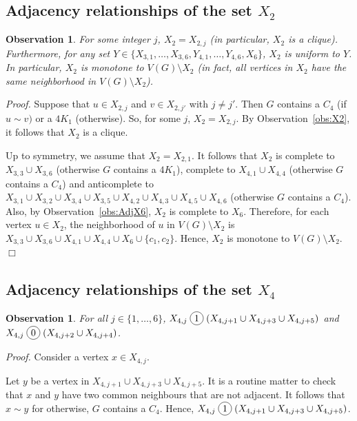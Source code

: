 \documentclass[12pt]{article}
\newcommand*\circled[1]{\tikz[baseline=(char.base)]{
		\node[shape=circle,draw,inner sep=2pt] (char) {#1};}}
\newtheorem{Observation}[Theorem]{Observation}
\newcommand{\join}{\; \circled{1} \;}
\newcommand{\cojoin}{\; \circled{0} \;}
\newcommand{\qed}{\hfill $\Box$}
\begin{document}
	\subsection{Adjacency relationships of the set $X_2$}\label{sec:X2}
	\begin{Observation}\label{obs:X2-uniform} 
		For some integer $j$, $X_2 = X_{2, j}$ (in particular, $X_2$ is a clique).  Furthermore, for any set $Y \in \{X_{3,1}, \ldots, X_{3,6}, Y_{4,1}, \ldots , Y_{4,6}, X_6 \}$, $X_2$ is uniform to $Y$. In particular, $X_2$ is monotone to $V(G)\setminus X_2$ (in fact, all vertices in $X_2$ have the same neighborhood in $V(G)\setminus X_2$).
	\end{Observation}
	{\it Proof.} 
	Suppose that $u\in X_{2, j}$ and $v\in X_{2, j'}$ with $j\neq j'$.  Then $G$ contains a $C_4$ (if $u\sim v)$ or a $4K_1$ (otherwise).  So, for some $j$, $X_2=X_{2, j}$.  By Observation~\ref{obs:X2}, it follows that $X_2$ is a clique. 
	
	Up to symmetry, we assume that $X_2 = X_{2, 1}$.  It follows that $X_2$ is complete to $X_{3, 3} \cup X_{3, 6}$ (otherwise $G$ contains a $4K_1$), complete to $X_{4, 1} \cup X_{4, 4}$ (otherwise $G$ contains a $C_4$) and anticomplete to $X_{3, 1} \cup X_{3, 2} \cup X_{3, 4} \cup X_{3, 5} \cup X_{4, 2} \cup X_{4, 3} \cup X_{4, 5} \cup X_{4, 6}$ (otherwise $G$ contains a $C_4$). Also, by Observation~\ref{obs:AdjX6}, $X_2$ is complete to $X_6$. Therefore, for each vertex $u\in X_2$, the neighborhood of $u$ in $V(G)\setminus X_2$ is $X_{3,3}\cup X_{3,6}\cup X_{4, 1} \cup X_{4, 4} \cup X_6\cup \{c_1,c_2\}$.
	Hence,  $X_2$ is monotone to $V(G) \setminus X_2$. 
	\qed
	
	
	
	\subsection{Adjacency relationships of the set $X_4$}\label{sec:X4}
	
	\begin{Observation}\label{obs:X4i-X4j}
		For all $j\in \{1, \dots, 6\}$, $X_{4,j} \join (X_{4,j+1} \cup X_{4,j+3} \cup X_{4,j+5})$ and 
		$X_{4,j} \cojoin (X_{4,j+2} \cup X_{4,j+4})$. 
	\end{Observation}
	\noindent
	{\it Proof.}  Consider a vertex $x \in X_{4,j}$. 
	
	Let $y$ be a vertex in $X_{4,j+1} \cup X_{4,j+3} \cup X_{4,j+5}$. It is a routine matter to check that $x$ and $y$ have two common neighbours that are not adjacent. It follows that $x\sim y$ for otherwise, $G$ contains a $C_4$.  Hence,  $X_{4,j} \join (X_{4,j+1} \cup X_{4,j+3} \cup X_{4,j+5})$. 
	
\end{document}
